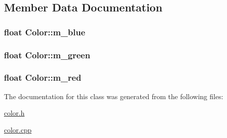 \subsection{Member Data Documentation}
\hypertarget{classColor_a68e36f358a0d335e9a7cadd748cb67b5}{
\subsubsection[{m\-\_\-blue}]{\setlength{\rightskip}{0pt plus 5cm}float Color\-::m\-\_\-blue\hspace{0.3cm}{\ttfamily [private]}}}\label{classColor_a68e36f358a0d335e9a7cadd748cb67b5}
\hypertarget{classColor_a6c884c0a93f4e23c5db71d003ec2857a}{
\subsubsection[{m\-\_\-green}]{\setlength{\rightskip}{0pt plus 5cm}float Color\-::m\-\_\-green\hspace{0.3cm}{\ttfamily [private]}}}\label{classColor_a6c884c0a93f4e23c5db71d003ec2857a}
\hypertarget{classColor_a6da1cc1b1358e18dce5fc0335a8abdb6}{
\subsubsection[{m\-\_\-red}]{\setlength{\rightskip}{0pt plus 5cm}float Color\-::m\-\_\-red\hspace{0.3cm}{\ttfamily [private]}}}\label{classColor_a6da1cc1b1358e18dce5fc0335a8abdb6}


The documentation for this class was generated from the following files\-:\begin{DoxyCompactItemize}
\item 
\hyperlink{color_8h}{color.\-h}\item 
\hyperlink{color_8cpp}{color.\-cpp}\end{DoxyCompactItemize}
